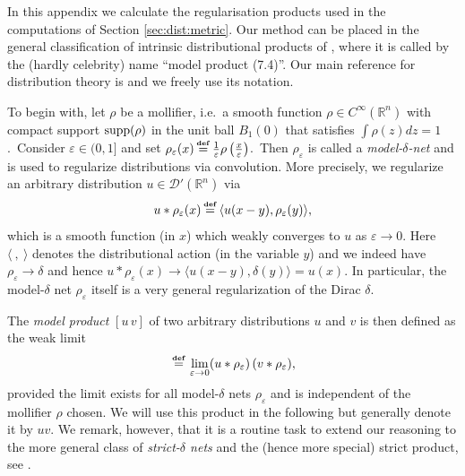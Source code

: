 \documentclass[11pt]{article}
\numberwithin{equation}{section}
\def\supp{\textup{supp}}
\def\defi{{\stackrel{\mbox{\tiny {\textbf{def}}}}{\,\, = \,\, }}}
\def\defi{{\stackrel{\mbox{\tiny \textup{\textbf{def}}}}{\,\, = \,\, }}}
\newcommand{\eps}{\varepsilon}
\newcommand{\lp}{\left(}
\newcommand{\rp}{\right)}
\begin{document}
In this appendix we calculate the regularisation products used in the computations of Section \ref{sec:dist:metric}. Our method can be placed in the general classification of intrinsic distributional products of \cite[p.\ 69]{Obe:92}, where it is called by the (hardly celebrity) name ``model product (7.4)''. Our main reference for distribution theory is \cite{FJ:98} and we freely use its notation.

To begin with, let $\rho$ be a mollifier, i.e.\ a smooth function $\rho\in C^{\infty}(\mathbb{R}^n)$ with compact support $\supp(\rho)$ in the unit ball $ B_1(0)$ that satisfies $\int\rho(z)dz=1$.\ Consider $\eps\in (0,1]$ and set $\rho_{\eps}(x)\defi \frac{1}{\eps}\rho\lp\frac{x}{\eps}\rp$.\ Then $\rho_{\eps}$ is called a \textit{model-$\delta$-net} and is used to regularize distributions via convolution. More precisely, we regularize an arbitrary distribution $u\in\mathcal{D}'(\mathbb{R}^n)$ via
\begin{equation}\label{eq:conv}
    u*\rho_\eps(x)\defi\langle u(x-y),\rho_\eps(y)\rangle, 
\end{equation}
which is a smooth function (in $x$) which weakly converges to $u$ as $\eps\to 0$. Here $\langle\ ,\ \rangle$ denotes the distributional action (in the variable $y$) and we indeed have $\rho_\eps\to\delta$ and hence $ u*\rho_\eps(x)\to\langle u(x-y),\delta(y)\rangle=u(x)$. In particular, the model-$\delta$ net $\rho_\eps$ itself is a very general regularization of the Dirac $\delta$.


The \textit{model product} $[u\,v]$ of two arbitrary distributions $u$ and $v$ is then defined as the weak limit 
\begin{equation}
    [u\,v]\defi\lim_{\eps\to 0} (u*\rho_\eps)\, (v*\rho_\eps), 
\end{equation} 
provided the limit exists for all model-$\delta$ nets $\rho_\eps$ and is independent of the mollifier $\rho$ chosen.
We will use this product in the following but generally denote it by $uv$. We remark, however, that it is a routine task to extend our reasoning to the more general class of \textit{strict-$\delta$ nets} and the (hence more special) strict product, see \cite[Def.\ 7.1]{Obe:92}.
\end{document}
